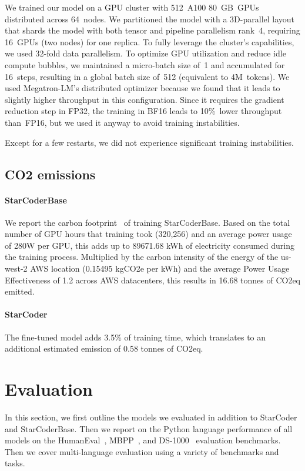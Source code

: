 We trained our model on a GPU cluster with 512~A100 80~GB~GPUs distributed across 64~nodes. We partitioned the model with a 3D-parallel layout that shards the model with both tensor and pipeline parallelism rank~4, requiring 16~GPUs (two nodes) for one replica. To fully leverage the cluster's capabilities, we used 32-fold data parallelism. To optimize GPU utilization and reduce idle compute bubbles, we maintained a micro-batch size of~1 and accumulated for 16~steps, resulting in a global batch size of~512 (equivalent to 4M~tokens). We used Megatron-LM's distributed optimizer because we found that it leads to slightly higher throughput in this configuration. Since it requires the gradient reduction step in FP32, the training in BF16 leads to 10\%~lower throughput than~FP16, but we used it anyway to avoid training instabilities.  

Except for a few restarts, we did not experience significant training instabilities. 

\subsection{CO2 emissions}\label{sec:co2emission}
\paragraph{StarCoderBase} We report the carbon footprint~\citep{lacoste2019quantifying} of training StarCoderBase. Based on the total number of GPU hours that training took (320,256) and an average power usage of 280W per GPU, this adds up to 89671.68 kWh of electricity consumed during the training process. Multiplied by the carbon intensity of the energy of the us-west-2 AWS location (0.15495 kgCO2e per kWh) and the average Power Usage Effectiveness of 1.2 across AWS datacenters,  this results in 16.68 tonnes of CO2eq emitted. 

\paragraph{StarCoder} The fine-tuned model adds 3.5\% of training time, which translates to an additional estimated emission of 0.58 tonnes of CO2eq.  \

\section{Evaluation}\label{sec:evaluation}

In this section, we first outline the models we evaluated in addition to StarCoder and StarCoderBase. Then we report on the Python language performance of all models on the HumanEval~\citep{chen2021codex}, MBPP~\citep{austin2021program}, and DS-1000~\citep{Lai2022DS1000} evaluation benchmarks. Then we cover multi-language evaluation using a variety of benchmarks and tasks.


